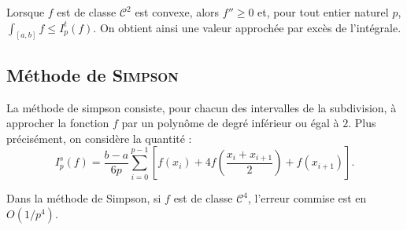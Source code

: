 \begin{remarque}
Lorsque $f$ est de classe $\mathscr{C}^2$ est convexe, alors $f'' \geq 0$ et, pour tout entier naturel $p$, $\int_{[a,b]} f \leq I_p^t(f)$. On obtient ainsi une valeur approchée par excès de l'intégrale.
\end{remarque}

\subsection{Méthode de \textsc{Simpson}}

La méthode de simpson consiste, pour chacun des intervalles de la subdivision, à approcher la fonction $f$ par un polynôme de degré inférieur ou égal à $2$. Plus précisément, on considère la quantité :
\[
I_p^s(f) = \frac{b-a}{6 p} \sum_{i=0}^{p-1} \left[f(x_i)+ 4 f\left(\frac{x_i + x_{i+1}}{2}\right) + f(x_{i+1})\right].
\]

\begin{prop}{}{}
Dans la méthode de Simpson, si $f$ est de classe $\mathscr{C}^4$, l'erreur commise est en $O(1/p^4)$.
\end{prop}

